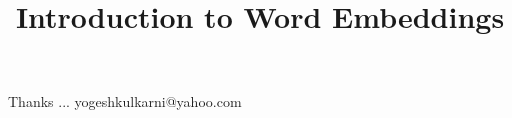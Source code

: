 \documentclass[xcolor=dvipsnames,compress,t,pdf,notes,9pt]{beamer}
\title[\insertframenumber /\inserttotalframenumber]{Introduction to Word Embeddings}
\begin{document}
	\begin{frame}
	\titlepage
	\end{frame}

	
	
	\begin{frame}[c]{}
	Thanks ...
	\vspace{5mm}
	yogeshkulkarni@yahoo.com
	\end{frame}
\end{document}
